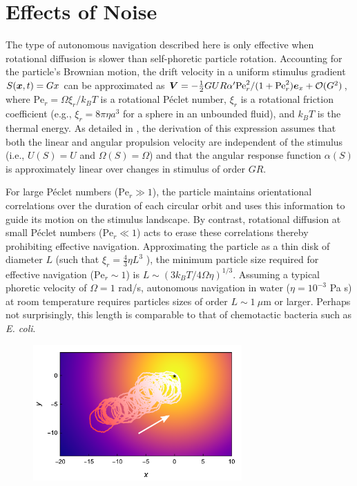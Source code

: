 \section{Effects of Noise} 
The type of autonomous navigation described here is only effective when rotational diffusion is slower than self-phoretic particle rotation.  Accounting for the particle's Brownian motion, the drift velocity in a uniform stimulus gradient $S(\boldsymbol{x},t)=G x$ can be approximated as $\boldsymbol{V}=-\tfrac{1}{2} G U R \alpha' \text{Pe}^2_r / (1+ \text{Pe}_r^2) \boldsymbol{e}_x +\mathcal{O}(G^2)$, where $\text{Pe}_r =\Omega\xi_r/k_B T$ is a rotational P\'eclet number, $\xi_r$ is a rotational friction coefficient (e.g., $\xi_r=8\pi\eta a^3$ for a sphere in an unbounded fluid), and $k_B T$ is the thermal energy.  As detailed in \autocite{Supp}, the derivation of this expression assumes that both the linear and angular propulsion velocity are independent of the stimulus (i.e., $U(S)=U$ and $\Omega(S)=\Omega$) and that the angular response function $\alpha(S)$ is approximately linear over changes in stimulus of order $GR$.  

For large P\'eclet numbers ($\text{Pe}_r\gg1$), the particle maintains orientational correlations over the duration of each circular orbit and uses this information to guide its motion on the stimulus landscape.  By contrast, rotational diffusion at small P\'eclet numbers ($\text{Pe}_r\ll1$) acts to erase these correlations thereby prohibiting effective navigation. Approximating the particle as a thin disk of diameter $L$ (such that $\xi_r=\tfrac{4}{3}\eta L^3$ \autocite{Kim2005}), the minimum particle size required for effective navigation ($\text{Pe}_r\sim1$) is $L\sim(3k_B T/4\Omega\eta)^{1/3}$.  Assuming a typical phoretic velocity of $\Omega=1$ rad/s, autonomous navigation in water ($\eta=10^{-3}$ Pa s) at room temperature requires particles sizes of order $L\sim 1~\mu$m or larger. Perhaps not surprisingly, this length is comparable to that of chemotactic bacteria such as \emph{E. coli}. 

\begin{figure}[h!]
     \centering
     \includegraphics[width=8cm]{figures/4_4.pdf}
     \caption{}
     \label{fig:4.4}
 \end{figure}

